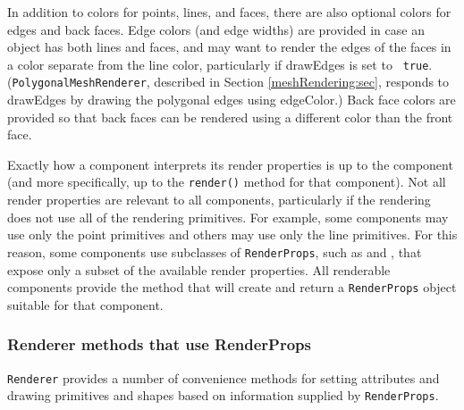 In addition to colors for points, lines, and faces, there are also
optional colors for edges and back faces. Edge colors (and edge
widths) are provided in case an object has both lines and faces, and
may want to render the edges of the faces in a color separate from the
line color, particularly if {\sf drawEdges} is set to {\tt
true}. ({\tt PolygonalMeshRenderer}, described in Section
\ref{meshRendering:sec}, responds to {\sf drawEdges} by drawing the
polygonal edges using {\sf edgeColor}.)  Back face colors are provided
so that back faces can be rendered using a different color than the
front face.

Exactly how a component interprets its render properties is up to the
component (and more specifically, up to the {\tt render()} method for that
component).  Not all render properties are relevant to all components,
particularly if the rendering does not use all of the rendering
primitives. For example, some components may use only
the point primitives and others may use only
the line primitives. For this reason, some components use subclasses
of {\tt RenderProps}, such as
 and
, that expose only a subset
of the available render properties. All renderable components provide
the method
 that
will create and return a {\tt RenderProps} object suitable for that
component.

\subsubsection{Renderer methods that use RenderProps}

{\tt Renderer} provides a number of convenience methods for setting
attributes and drawing primitives and shapes based on information
supplied by {\tt RenderProps}.

